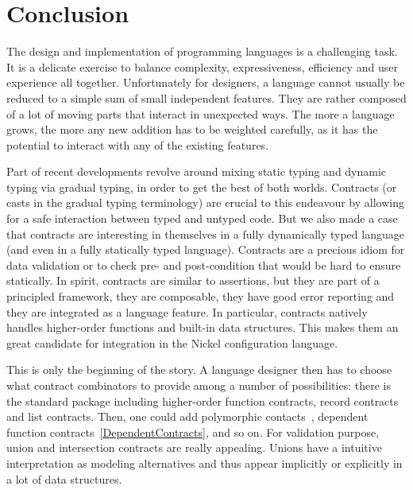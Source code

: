 \documentclass[sigplan,10pt,review,anonymous]{acmart}
\begin{document}
\newpage

\section{Conclusion}
\label{sec:conclusion}

The design and implementation of programming languages is a challenging task. It
is a delicate exercise to balance complexity, expressiveness, efficiency and
user experience all together. Unfortunately for designers, a language cannot
usually be reduced to a simple sum of small independent features. They are
rather composed of a lot of moving parts that interact in unexpected ways. The
more a language grows, the more any new addition has to be weighted carefully,
as it has the potential to interact with any of the existing features.

Part of recent developments revolve around mixing static typing and dynamic
typing via gradual typing, in order to get the best of both worlds. Contracts
(or casts in the gradual typing terminology) are crucial to this endeavour by
allowing for a safe interaction between typed and untyped code. But we also made
a case that contracts are interesting in themselves in a fully dynamically typed
language (and even in a fully statically typed language).  Contracts are a
precious idiom for data validation or to check pre- and post-condition that
would be hard to ensure statically. In spirit, contracts are similar to
assertions, but they are part of a principled framework, they are composable,
they have good error reporting and they are integrated as a language feature. In
particular, contracts natively handles higher-order functions and built-in data
structures. This makes them an great candidate for integration in the Nickel
configuration language.

This is only the beginning of the story. A language designer then has to choose
what contract combinators to provide among a number of possibilities: there is
the standard package including higher-order function contracts, record contracts
and list contracts.  Then, one could add polymorphic
contacts~\cite{BlameForAll}, dependent function
contracts~\ref{DependentContracts}, and so on. For validation purpose, union and
intersection contracts are really appealing. Unions have a intuitive
interpretation as modeling alternatives and thus appear implicitly or explicitly
in a lot of data structures.
\end{document}
